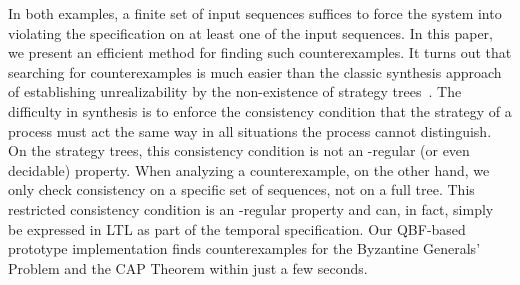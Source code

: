 \documentclass{LMCS}
\theoremstyle{plain}\newtheorem{theorem}[thm]{Theorem}
\theoremstyle{plain}\newtheorem{lemma}[thm]{Lemma}
\theoremstyle{plain}\newtheorem{proposition}[thm]{Proposition}
\theoremstyle{plain}\newtheorem{corollary}[thm]{Corollary}
\theoremstyle{definition}\newtheorem{definition}{Definition}[section]
\begin{document}
In both examples, a finite set of input sequences suffices to force the system into violating the specification on at least one of the input sequences.
In this paper, we present an efficient method for finding such counterexamples.
It turns out that searching for counterexamples is much easier than the classic synthesis approach of establishing unrealizability by the non-existence of strategy trees~\cite{DBLP:conf/focs/PnueliR90,DBLP:conf/lics/KupfermanV01,DBLP:conf/lics/FinkbeinerS05}. The difficulty in synthesis is to enforce the consistency condition that the strategy of a process must act the same way in all situations the process cannot distinguish.
On the strategy trees, this consistency condition is not an -regular (or even decidable) property. 
When analyzing a counterexample, on the other hand, we only check consistency on a specific set of sequences, not on a full tree. This restricted consistency condition is an -regular property and can, in fact, simply be expressed in LTL as part of the temporal specification.
Our QBF-based prototype implementation finds counterexamples for the Byzantine Generals' Problem and the CAP Theorem within just a few seconds. 
\end{document}
